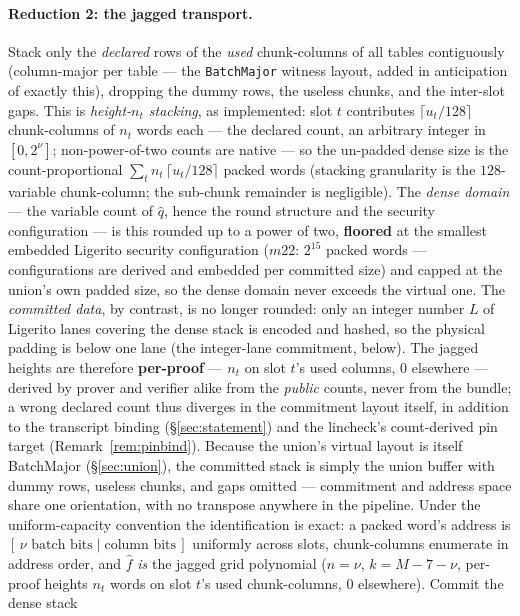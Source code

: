 \documentclass[11pt]{article}
\newcommand{\code}[1]{\texttt{#1}}
\theoremstyle{definition}
\begin{document}
\paragraph{Reduction 2: the jagged transport.} Stack only the
\emph{declared} rows of the \emph{used} chunk-columns of all tables
contiguously (column-major per table --- the \code{BatchMajor} witness
layout, added in anticipation of exactly this), dropping the dummy rows,
the useless chunks, and the inter-slot gaps. This is \emph{height-$n_t$
stacking}, as implemented: slot $t$ contributes $\lceil u_t/128\rceil$
chunk-columns of $n_t$ words each --- the declared count, an arbitrary
integer in $[0, 2^{\nu}]$; non-power-of-two counts are native --- so the
un-padded dense size is the count-proportional
$\sum_t n_t\,\lceil u_t/128\rceil$ packed words (stacking granularity is
the $128$-variable chunk-column; the sub-chunk remainder is negligible).
The \emph{dense domain} --- the variable count of $\hat q$, hence the
round structure and the security configuration --- is this rounded up
to a power of two, \textbf{floored} at the smallest embedded Ligerito
security configuration ($m22$: $2^{15}$ packed words --- configurations
are derived and embedded per committed size) and capped at the union's
own padded size, so the dense domain never exceeds the virtual one. The
\emph{committed data}, by contrast, is no longer rounded: only an
integer number $L$ of Ligerito lanes covering the dense stack is
encoded and hashed, so the physical padding is below one lane (the
integer-lane commitment, below). The
jagged heights are therefore \textbf{per-proof} --- $n_t$ on slot $t$'s
used columns, $0$ elsewhere --- derived by prover and verifier alike
from the \emph{public} counts, never from the bundle; a wrong declared
count thus diverges in the commitment layout itself, in addition to the
transcript binding (\S\ref{sec:statement}) and the lincheck's
count-derived pin target (Remark~\ref{rem:pinbind}). Because the
union's virtual layout is itself BatchMajor (\S\ref{sec:union}), the
committed stack is simply the union buffer with dummy rows, useless
chunks, and gaps omitted ---
commitment and address space share one orientation, with no transpose
anywhere in the pipeline. Under the uniform-capacity convention the
identification is exact: a packed word's address is $[\,\nu \text{ batch
bits} \mid \text{column bits}\,]$ uniformly across slots, chunk-columns
enumerate in address order, and $\hat f$ \emph{is} the jagged grid
polynomial ($n = \nu$, $k = M - 7 - \nu$, per-proof heights $n_t$ words
on slot $t$'s used chunk-columns, $0$ elsewhere). Commit the dense stack
\end{document}
